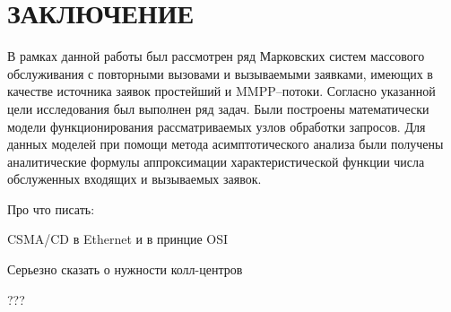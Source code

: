 \section*{\centering ЗАКЛЮЧЕНИЕ}
В рамках данной работы был рассмотрен ряд Марковских систем массового обслуживания с повторными вызовами и вызываемыми заявками, имеющих в качестве источника заявок простейший и MMPP--потоки. Согласно указанной цели исследования был выполнен ряд задач. Были построены математически модели функционирования рассматриваемых узлов обработки запросов. Для данных моделей при помощи метода асимптотического анализа  были получены аналитические формулы аппроксимации характеристической функции числа обслуженных входящих и вызываемых заявок.


Про что писать:

CSMA/CD в Ethernet и в принцие OSI

Серьезно сказать о нужности колл-центров

???
 \clearpage